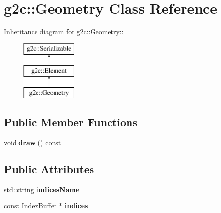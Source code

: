\hypertarget{classg2c_1_1_geometry}{
\section{g2c::Geometry Class Reference}
\label{classg2c_1_1_geometry}
}
Inheritance diagram for g2c::Geometry::\begin{figure}[H]
\begin{center}
\leavevmode
\includegraphics[height=3cm]{classg2c_1_1_geometry}
\end{center}
\end{figure}
\subsection*{Public Member Functions}
\begin{DoxyCompactItemize}
\item 
\hypertarget{classg2c_1_1_geometry_a0fddf5dee834d1b3c8e2dc3d3e3b9557}{
void {\bfseries draw} () const }
\label{classg2c_1_1_geometry_a0fddf5dee834d1b3c8e2dc3d3e3b9557}

\end{DoxyCompactItemize}
\subsection*{Public Attributes}
\begin{DoxyCompactItemize}
\item 
\hypertarget{classg2c_1_1_geometry_afeec577d78767205f4be6b50626d87c6}{
std::string {\bfseries indicesName}}
\label{classg2c_1_1_geometry_afeec577d78767205f4be6b50626d87c6}

\item 
\hypertarget{classg2c_1_1_geometry_ae1d3cd504bfe1d2a9afea2f5fff7aa53}{
const \hyperlink{classg2c_1_1_index_buffer}{IndexBuffer} $\ast$ {\bfseries indices}}
\label{classg2c_1_1_geometry_ae1d3cd504bfe1d2a9afea2f5fff7aa53}

\end{DoxyCompactItemize}
